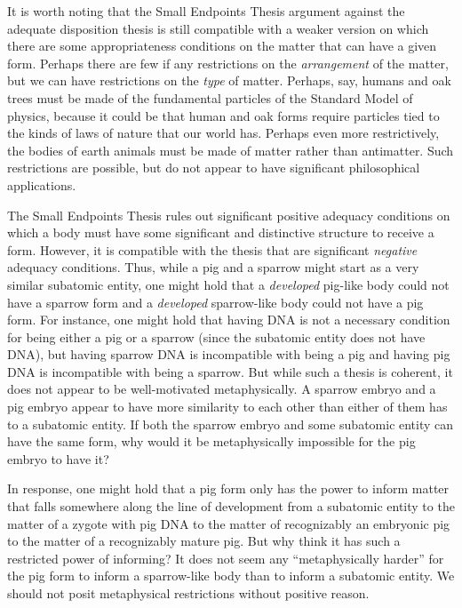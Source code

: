 It is worth noting that the Small Endpoints Thesis argument against the adequate disposition thesis is still compatible with 
a weaker version on which there are some appropriateness conditions on the matter that can have a given form. Perhaps there 
are few if any restrictions on the \textit{arrangement} of the matter, but we can have restrictions on the \textit{type} of 
matter. Perhaps, say, humans and oak trees must be made of the fundamental particles of the Standard Model of physics,
because it could be that human and oak forms require particles tied to the kinds of laws of nature that our world has.
Perhaps even more restrictively, the bodies of earth animals must be made of matter rather than antimatter. Such restrictions
are possible, but do not appear to have significant philosophical applications.

The Small Endpoints Thesis rules out significant positive adequacy conditions on which a body must have some significant and 
distinctive structure to receive a form. However, it is compatible with the thesis that are significant \textit{negative} adequacy 
conditions. Thus, while a pig and a sparrow might start as a very similar subatomic entity, one might hold that a \textit{developed}
pig-like body could not have a sparrow form and a \textit{developed} sparrow-like body could not have a pig form. For instance, 
one might hold that having DNA is not a necessary condition for being either a pig or a sparrow (since the subatomic entity 
does not have DNA), but having sparrow DNA is incompatible with being a pig and having pig DNA is incompatible with being 
a sparrow. But while such a thesis is coherent, it does not appear to be well-motivated metaphysically. A sparrow embryo and 
a pig embryo appear to have more similarity to each other than either of them has to a subatomic entity. If both the sparrow 
embryo and some subatomic entity can have the same form, why would it be metaphysically impossible for the pig embryo to have 
it? 

In response, one might hold that a pig form only has the power to inform matter that falls somewhere along the line of 
development from a subatomic entity to the matter of a zygote with pig DNA to the matter of recognizably an embryonic pig to 
the matter of a recognizably mature pig. But why think it has such a restricted power of informing? It does not seem any 
``metaphysically harder'' for the pig form to inform a sparrow-like body than to inform a subatomic entity. We should not 
posit metaphysical restrictions without positive reason.

